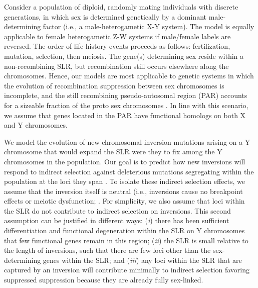 \documentclass[11pt]{article}
\begin{document}
Consider a population of diploid, randomly mating individuals with discrete generations, in which sex is determined genetically by a dominant male-determining factor (i.e., a male-heterogametic X-Y system). The model is equally applicable to female heterogametic Z-W systems if male/female labels are reversed. The order of life history events proceeds as follows: fertilization, mutation, selection, then meiosis. The gene(s) determining sex reside within a non-recombining SLR, but recombination still occurs elsewhere along the chromosomes. Hence, our models are most applicable to genetic systems in which the evolution of recombination suppression between sex chromosomes is incomplete, and the still recombining pseudo-autosomal region (PAR) accounts for a sizeable fraction of the proto sex chromosomes \citep[e.g.,][]{Otto2011,Otto2014}. In line with this scenario, we assume that genes located in the PAR have functional homologs on both X and Y chromosomes. 

We model the evolution of new chromosomal inversion mutations arising on a Y chromosome that would expand the SLR were they to fix among the Y chromosomes in the population. Our goal is to predict how new inversions will respond to indirect selection against deleterious mutations segregating within the population at the loci they span \citep[e.g.,][]{Nei1967}. To isolate these indirect selection effects, we assume that the inversion itself is neutral (i.e., inversions cause no breakpoint effects or meiotic dysfunction; \citealt{CorbettDetig2016, KrimbasPowell1992,OlitoAbbott2020, Villoutreix-etal-2021}. For simplicity, we also assume that loci within the SLR do not contribute to indirect selection on inversions. This second assumption can be justified in different ways: ({\itshape i}) there has been sufficient differentiation and functional degeneration within the SLR on Y chromosomes that few functional genes remain in this region; ({\itshape ii}) the SLR is small relative to the length of inversions, such that there are few loci other than the sex-determining genes within the SLR; and ({\itshape iii}) any loci within the SLR that are captured by an inversion will contribute minimally to indirect selection favoring suppressed suppression because they are already fully sex-linked. 
\end{document}
